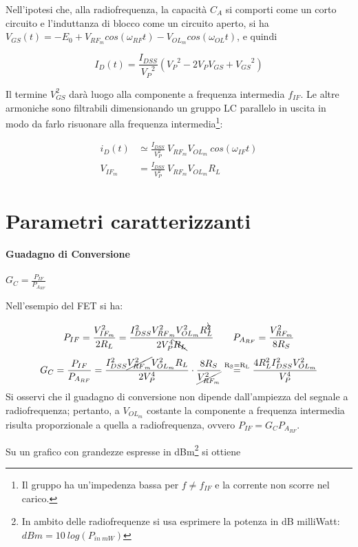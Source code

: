 Nell'ipotesi che, alla	radiofrequenza, la capacità $C_{A}$ si comporti come un corto circuito e l'induttanza di blocco come un circuito aperto, si ha $V_{GS}(t) = -E_0 + V_{RF_m} cos(\omega_{RF}t) - V_{OL_m} cos(\omega_{OL}t)$, e quindi

$$I_D(t) = \frac{I_{DSS}}{{V_P}^2} \left( {V_P}^2 - 2 V_P V_{GS} + {V_{GS}}^2 \right) $$

Il termine $V_{GS}^2$ darà luogo alla componente a frequenza intermedia $f_{IF}$. Le altre armoniche sono filtrabili dimensionando un gruppo LC parallelo in uscita in modo da farlo risuonare alla frequenza intermedia\footnote{Il gruppo ha un'impedenza bassa per $f \neq f_{IF}$ e la corrente non scorre nel carico.}:

\begin{align*}
i_D(t) &\simeq \frac{I_{DSS}}{V_P^2} ~ V_{RF_m} V_{OL_m} ~ cos (\omega_{IF} t)
\\
V_{IF_m} &= \frac{I_{DSS}}{V_P^2} ~ V_{RF_m} V_{OL_m} R_L
\end{align*}




\section{Parametri caratterizzanti}

\paragraph{Guadagno di Conversione} $G_C = \frac{P_{IF}}{{P_{A_{RF}}}}$

Nell'esempio del FET si ha:

$$ P_{IF} = \frac{V_{IF_m}^2}{2 R_L} = \frac{I_{DSS}^2 V_{{RF}_m}^2 V_{{OL}_m}^2 R_L^{\bcancel{2}} }{2 V_P^4 \bcancel{R_L}} ~~~~~~ {P_{A_{RF}}} = \frac{V_{RF_m}^2}{8R_S}$$
$$ G_C = \frac{P_{IF}}{P_{A_{RF}}} = \frac{I_{DSS}^2 \cancel{V_{{RF}_m}^2} V_{{OL}_m}^2 R_L }{2 V_P^4} \cdot \frac{8R_S}{\cancel{V_{RF_m}^2}} \overset{\mathrm{R_S = R_L}}{=} \frac{4 R_L^2 I_{DSS}^2 V_{OL_m}^2}{V_P^4} $$
Si osservi che il guadagno di conversione non dipende dall'ampiezza del segnale a radiofrequenza; pertanto, a $V_{OL_m}$ costante la componente a frequenza intermedia risulta proporzionale a quella a radiofrequenza, ovvero
$P_{IF} = G_C {P_{A_{RF}}}$.

Su un grafico con grandezze espresse in dBm\footnote{In ambito delle radiofrequenze si usa esprimere la potenza in dB milliWatt: $dBm = 10 ~ log(P_{in~mW})$} si ottiene

